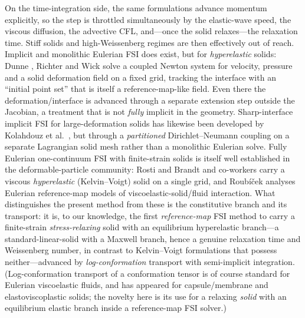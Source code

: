 \documentclass[final,3p,times]{elsarticle}
\theoremstyle{remark}
\begin{document}
On the time-integration side, the same formulations advance momentum explicitly, so
the step is throttled simultaneously by the elastic-wave speed, the viscous diffusion, the
advective CFL, and---once the solid relaxes---the relaxation time. Stiff solids and
high-Weissenberg regimes are then effectively out of reach. Implicit and monolithic Eulerian FSI does exist, but for
\emph{hyperelastic} solids: Dunne \cite{Dunne2006}, Richter \cite{Richter2013,Richter2017}
and Wick \cite{Wick2013} solve a coupled Newton system for velocity, pressure and a
solid deformation field on a fixed grid, tracking the interface with an ``initial point
set'' that is itself a reference-map-like field. Even there the deformation/interface is
advanced through a separate extension step outside the Jacobian, a treatment that is not
\emph{fully} implicit in the geometry. Sharp-interface implicit FSI for large-deformation
solids has likewise been developed by Kolahdouz et al.\ \cite{Kolahdouz2023}, but
through a \emph{partitioned} Dirichlet--Neumann coupling on a separate Lagrangian solid
mesh rather than a monolithic Eulerian solve. Fully Eulerian one-continuum FSI with
finite-strain solids is itself well established in the deformable-particle community: Rosti
and Brandt and co-workers \cite{Rosti2017,Rosti2018jnnfm,Rosti2018prf} carry a viscous
\emph{hyperelastic} (Kelvin--Voigt) solid on a single grid, and Roub\'i\v{c}ek
\cite{Roubicek2022} analyses Eulerian reference-map models of viscoelastic-solid/fluid
interaction. What distinguishes the present method from these is the constitutive branch and
its transport: it is, to our knowledge, the first \emph{reference-map} FSI method to carry a
finite-strain \emph{stress-relaxing} solid with an equilibrium hyperelastic branch---a
standard-linear-solid with a Maxwell branch, hence a genuine relaxation time and Weissenberg
number, in contrast to Kelvin--Voigt formulations that possess neither---advanced by
\emph{log-conformation} transport with semi-implicit integration. (Log-conformation transport of
a conformation tensor is of course standard for Eulerian viscoelastic fluids, and has
appeared for capsule/membrane and elastoviscoplastic solids; the novelty here is its use for a
relaxing \emph{solid} with an equilibrium elastic branch inside a reference-map FSI solver.)
\end{document}
